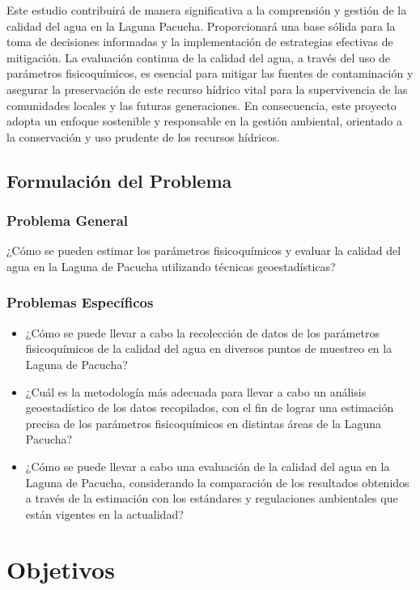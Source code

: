 Este estudio contribuirá de manera significativa a la comprensión y gestión de la calidad del agua en la Laguna Pacucha. Proporcionará una base sólida para la toma de decisiones informadas y la implementación de estrategias efectivas de mitigación. La evaluación continua de la calidad del agua, a través del uso de parámetros fisicoquímicos, es esencial para mitigar las fuentes de contaminación y asegurar la preservación de este recurso hídrico vital para la supervivencia de las comunidades locales y las futuras generaciones. En consecuencia, este proyecto adopta un enfoque sostenible y responsable en la gestión ambiental, orientado a la conservación y uso prudente de los recursos hídricos.

\subsection{Formulación del Problema}

\subsubsection{Problema General}
¿Cómo se pueden estimar los parámetros fisicoquímicos y evaluar la calidad del agua en la Laguna de Pacucha utilizando técnicas geoestadísticas?

\subsubsection{Problemas Específicos}
\begin{itemize}
    \item ¿Cómo se puede llevar a cabo la recolección de datos de los parámetros fisicoquímicos de la calidad del agua en diversos puntos de muestreo en la Laguna de Pacucha?
    \item ¿Cuál es la metodología más adecuada para llevar a cabo un análisis geoestadístico de los datos recopilados, con el fin de lograr una estimación precisa de los parámetros fisicoquímicos en distintas áreas de la Laguna Pacucha?
    \item ¿Cómo se puede llevar a cabo una evaluación de la calidad del agua en la Laguna de Pacucha, considerando la comparación de los resultados obtenidos a través de la estimación con los estándares y regulaciones ambientales que están vigentes en la actualidad?
\end{itemize}



\section{Objetivos}

